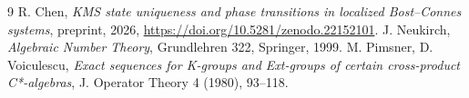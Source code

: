 \documentclass[11pt]{amsart}
\theoremstyle{remark}
\begin{document}
\begin{thebibliography}{9}
 R. Chen, \emph{KMS state uniqueness and phase transitions in localized Bost--Connes systems}, preprint, 2026, \newline\url{https://doi.org/10.5281/zenodo.22152101}.
 J. Neukirch, \emph{Algebraic Number Theory}, Grundlehren 322, Springer, 1999.
 M. Pimsner, D. Voiculescu, \emph{Exact sequences for K-groups and Ext-groups of certain cross-product C*-algebras}, J. Operator Theory 4 (1980), 93--118.
\end{thebibliography}
\end{document}
